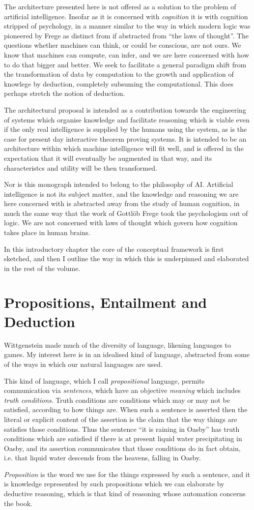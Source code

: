 The architecture presented here is not offered as a solution to the problem of artificial intelligence.
Insofar as it is concerned with {\it cognition} it is with cognition stripped of psychology, in a manner similar to the way in which modern logic was pioneered by Frege as distinct from if abstracted from ``the laws of thought''.
The questions whether machines can think, or could be conscious, are not ours.
We know that machines can compute, can infer, and we are here concerned with how to do that bigger and better.
We seek to facilitate a general paradigm shift from the transformation of data by computation to the growth and application of knowlege by deduction, completely subsuming the computational.
This does perhaps stretch the notion of deduction.

The architectural proposal is intended as a contribution towards the engineering of systems which organise knowledge and facilitate reasoning which is viable even if the only real intelligence is supplied by the humans using the system, as is the case for present day interactive theorem proving systems.
It is intended to be an architecture within which machine intelligence will fit well, and is offered in the expectation that it will eventually be augmented in that way, and its characteristcs and utility will be then transformed.

Nor is this monograph intended to belong to the philosophy of AI.
Artificial intelligence is not its subject matter, and the knowledge and reasoning we are here concerned with is abstracted away from the study of human cognition, in much the same way that the work of Gottl{\"o}b Frege took the psychologism out of logic.
We are not concerned with laws of thought which govern how cognition takes place in human brains.

In this introductory chapter the core of the conceptual framework is first sketched, and then I outline the way in which this is underpinned and elaborated in the rest of the volume.

\section{Propositions, Entailment and Deduction}

Wittgenstein made much of the diversity of language, likening languages to games.
My interest here is in an idealised kind of language, abstracted from some of the ways in which our natural languages are used.

This kind of language, which I call {\it propositional} language, permits communication via {\it sentences}, which have an objective {\it meaning} which includes {\it truth conditions}.
Truth conditions are conditions which may or may not be satisfied, according to how things are.
When such a sentence is asserted then the literal or explicit content of the assertion is the claim that the way things are satisfies those conditions.
Thus the sentence ``it is raining in Oasby'' has truth conditions which are satisfied if there is at present liquid water precipitating in Oasby, and its assertion communicates that those conditions do in fact obtain, i.e. that liquid water descends from the heavens, falling in Oasby.

{\it Proposition} is the word we use for the things expressed by such a sentence, and it is knowledge represented by such propositions which we can elaborate by deductive reasoning, which is that kind of reasoning whose automation concerns the book.





